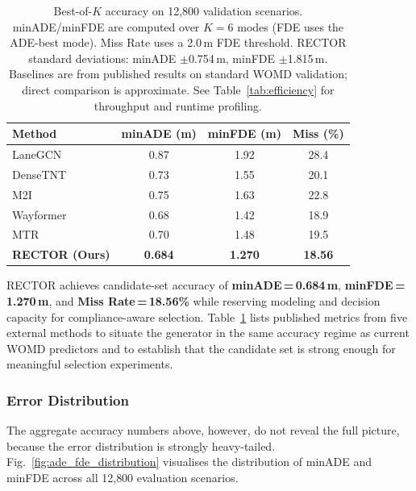 \begin{table}[t]
\centering
\caption{Candidate-Set Accuracy Context on WOMD \texttt{validation\_interactive}}
\label{tab:main_results}
\begin{tabular}{lccc}
\toprule
\textbf{Method} & \textbf{minADE (m)} \color{green}{$\downarrow$} & \textbf{minFDE (m)} \color{green}{$\downarrow$} & \textbf{Miss (\%)} \color{green}{$\downarrow$} \\
\midrule
LaneGCN & 0.87 & 1.92 & 28.4 \\
DenseTNT & 0.73 & 1.55 & 20.1 \\
M2I & 0.75 & 1.63 & 22.8 \\
Wayformer & 0.68 & 1.42 & 18.9 \\
MTR & 0.70 & 1.48 & 19.5 \\
\midrule
\textbf{RECTOR (Ours)} & \textbf{0.684} & \textbf{1.270} & \textbf{18.56} \\
\bottomrule
\end{tabular}
\vspace{1mm}
\caption*{\footnotesize Best-of-$K$ accuracy on 12{,}800 validation scenarios.  minADE/minFDE are computed over $K{=}6$ modes (FDE uses the ADE-best mode).  Miss Rate uses a 2.0\,m FDE threshold.  RECTOR standard deviations: minADE $\pm$0.754\,m, minFDE $\pm$1.815\,m.  Baselines are from published results on standard WOMD validation; direct comparison is approximate.  See Table~\ref{tab:efficiency} for throughput and runtime profiling.}
\end{table}

RECTOR achieves candidate-set accuracy of \textbf{minADE\,=\,0.684\,m}, \textbf{minFDE\,=\,1.270\,m}, and \textbf{Miss Rate\,=\,18.56\%} while reserving modeling and decision capacity for compliance-aware selection.  Table~\ref{tab:main_results} lists published metrics from five external methods to situate the generator in the same accuracy regime as current WOMD predictors and to establish that the candidate set is strong enough for meaningful selection experiments.

\subsubsection{Error Distribution}

The aggregate accuracy numbers above, however, do not reveal the full picture, because the error distribution is strongly heavy-tailed. Fig.~\ref{fig:ade_fde_distribution} visualises the distribution of minADE and minFDE across all 12{,}800 evaluation scenarios.

